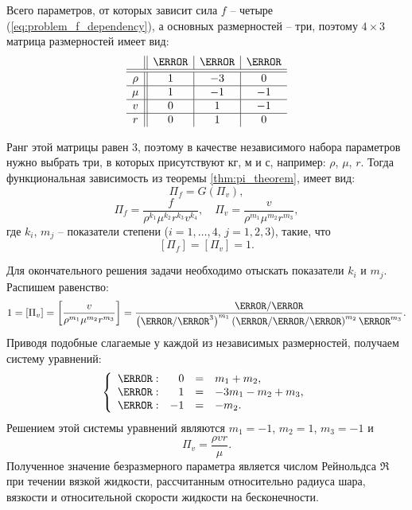 \documentclass[14pt]{extarticle}
\begin{document}
Всего параметров, от которых зависит сила $f$ -- четыре (\ref{eq:problem_f_dependency}), а основных размерностей -- три, поэтому $4 \times 3$ матрица размерностей имеет вид:
\[
\begin{array}{c||c|c|c}
		& \kg & \m &  \s \\
	\hline
	\hline
	\rho & 1 & -3 & 0 \\
	\hline
	\mu & 1 & -1 & -1 \\
	\hline
	v & 0 & 1 & -1 \\
	\hline
	r & 0 & 1 & 0 \\
\end{array}
\]

Ранг этой матрицы равен $3$, поэтому в качестве независимого набора параметров нужно выбрать три, в которых присутствуют кг, м и с, например: $\rho$, $\mu$, $r$. Тогда функциональная зависимость из теоремы \ref{thm:pi_theorem}, имеет вид:
\[
\Pi_f =  G(\Pi_v),
\]
\[
\Pi_f = \frac{f}{\rho^{k_1} \mu^{k_2} r^{k_3} v^{k_4}},\quad
\Pi_v = \frac{v}{\rho^{m_1} \mu^{m_2} r^{m_3}},
\]
где $k_i$, $m_j$ -- показатели степени ($i=1,\ldots,4$, $j=1,2,3$), такие, что
\[
[\Pi_f] = [\Pi_v] = 1.
\]

Для окончательного решения задачи необходимо отыскать показатели $k_i$ и $m_j$.
Распишем равенство:
\[
1 =  [\Pi_v] = \left[\frac{v}{\rho^{m_1} \mu^{m_2} r^{m_3}}\right] = 
\frac{\m/\s}{ 
	\left( \kg/\m^3       \right)^{m_1}
	\left(\kg/\m/\s\right)^{m_2}
	\m^{m_3}
}.
\]
Приводя подобные слагаемые у каждой из независимых размерностей, получаем систему уравнений:
\[
\left\{
\begin{array}{lrcl}
	\kg: &
	0 &  = & m_1 + m_2, \\
	\m: & 
	1 & = & -3 m_1 - m_2 + m_3,\\
	\s: &
	-1 & = &  -m_2.
\end{array}
\right.
\]
Решением этой системы уравнений являются $m_1 = -1$, $m_2 = 1$, $m_3 = -1$ и
\[
\Pi_v = \frac{\rho v r}{\mu}.
\]
Полученное значение безразмерного параметра является числом Рейнольдса $\Re$ при течении вязкой жидкости, рассчитанным относительно радиуса шара, вязкости и относительной скорости жидкости на бесконечности.
\end{document}
